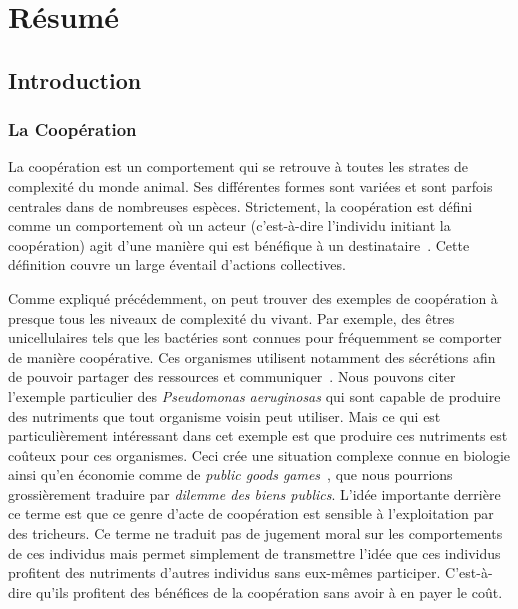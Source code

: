 \chapter{Résumé}

\minitoc[n] %

\section{Introduction}

	\subsection{La Coopération} %


		La coopération est un comportement qui se retrouve à toutes les strates de complexité du monde animal. Ses différentes formes sont variées et sont parfois centrales dans de nombreuses espèces. Strictement, la coopération est défini comme un comportement où un acteur (c'est-à-dire l'individu initiant la coopération) agit d'une manière qui est bénéfique à un destinataire~\parencite{West2007a}. Cette définition couvre un large éventail d'actions collectives.

		Comme expliqué précédemment, on peut trouver des exemples de coopération à presque tous les niveaux de complexité du vivant. Par exemple, des êtres unicellulaires tels que les bactéries sont connues pour fréquemment se comporter de manière coopérative. Ces organismes utilisent notamment des sécrétions afin de pouvoir partager des ressources et communiquer~\parencite{Elena2003}. Nous pouvons citer l'exemple particulier des \emph{Pseudomonas aeruginosas} qui sont capable de produire des nutriments que tout organisme voisin peut utiliser. Mais ce qui est particulièrement intéressant dans cet exemple est que produire ces nutriments est coûteux pour ces organismes. Ceci crée une situation complexe connue en biologie ainsi qu'en économie comme de \emph{public goods games}~\parencite{Popat2012, Harrison2013}, que nous pourrions grossièrement traduire par \emph{dilemme des biens publics}. L'idée importante derrière ce terme est que ce genre d'acte de coopération est sensible à l'exploitation par des tricheurs. Ce terme ne traduit pas de jugement moral sur les comportements de ces individus mais permet simplement de transmettre l'idée que ces individus profitent des nutriments d'autres individus sans eux-mêmes participer. C'est-à-dire qu'ils profitent des bénéfices de la coopération sans avoir à en payer le coût.

